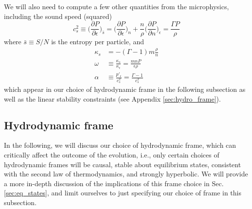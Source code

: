 \documentclass[%
notitlepage,
superscriptaddress,
nofootinbib,
amsmath,
amssymb,
aps,
twocolumn
]{revtex4-1}
\begin{document}
We will also need to compute a few other quantities from the microphysics, including the sound speed (squared)
\begin{equation} \label{eq:cs_sq}
c_s^2 \equiv \Big( \frac{\partial P}{\partial \epsilon} \Big)_{\bar{s}} = \Big( \frac{\partial P}{\partial \epsilon} \Big)_{n} + \frac{n}{\rho} \Big( \frac{\partial P}{\partial n} \Big)_{\epsilon} = \frac{\Gamma P}{\rho}
\end{equation}
where $\bar{s} \equiv S/N$ is the entropy per particle, and
\begin{align}
\kappa_{s} &= -(\Gamma - 1) m \frac{\rho}{n} \\
\omega &\equiv \frac{\kappa_{s}}{\kappa_{\epsilon}} = \frac{m n P}{\epsilon \rho} \label{eq:omega} \\
\alpha &\equiv \frac{p'_{\epsilon}}{c_s^2} = \frac{\Gamma - 1}{c_s^2} \label{eq:alpha}
\end{align}
which appear in our choice of hydrodynamic frame in the following subsection as well as the linear stability constraints (see Appendix \ref{sec:hydro_frame}).

\subsection{Hydrodynamic frame}

In the following, we will discuss our choice of hydrodynamic frame,
which can critically affect the outcome of the evolution, i.e., only
certain choices of hydrodynamic frames will be causal, stable about equilibrium states, consistent with the second law of thermodynamics, and strongly hyperbolic.
We will provide a more in-depth discussion of the implications of 
this frame choice in Sec. \ref{sec:eq_states}, and limit ourselves to
just specifying our choice of frame in this subsection.
\end{document}
